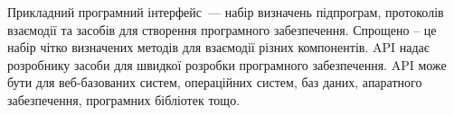Прикладний програмний інтерфейс~--- набір визначень підпрограм, протоколів взаємодії та засобів для створення програмного забезпечення. Спрощено -- це набір чітко визначених методів для взаємодії різних компонентів. API надає розробнику засоби для швидкої розробки програмного забезпечення. API може бути для веб-базованих систем, операційних систем, баз даних, апаратного забезпечення, програмних бібліотек тощо.
